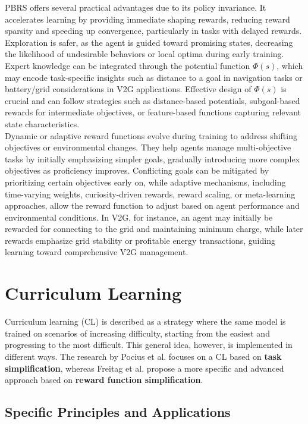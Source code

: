PBRS offers several practical advantages due to its policy invariance. It accelerates learning by providing immediate shaping rewards, reducing reward sparsity and speeding up convergence, particularly in tasks with delayed rewards. Exploration is safer, as the agent is guided toward promising states, decreasing the likelihood of undesirable behaviors or local optima during early training. Expert knowledge can be integrated through the potential function $\Phi(s)$, which may encode task-specific insights such as distance to a goal in navigation tasks or battery/grid considerations in V2G applications. Effective design of $\Phi(s)$ is crucial and can follow strategies such as distance-based potentials, subgoal-based rewards for intermediate objectives, or feature-based functions capturing relevant state characteristics.
\\
\noindent
Dynamic or adaptive reward functions evolve during training to address shifting objectives or environmental changes. They help agents manage multi-objective tasks by initially emphasizing simpler goals, gradually introducing more complex objectives as proficiency improves. Conflicting goals can be mitigated by prioritizing certain objectives early on, while adaptive mechanisms, including time-varying weights, curiosity-driven rewards, reward scaling, or meta-learning approaches, allow the reward function to adjust based on agent performance and environmental conditions. In V2G, for instance, an agent may initially be rewarded for connecting to the grid and maintaining minimum charge, while later rewards emphasize grid stability or profitable energy transactions, guiding learning toward comprehensive V2G management.




\section{Curriculum Learning}
\label{sec:curriculum_learning}
Curriculum learning (CL) is described as a strategy where the same model is trained on scenarios of increasing difficulty, starting from the easiest and progressing to the most difficult. This general idea, however, is implemented in different ways. The research by Pocius et al. \cite{Curriculum_learning_2} focuses on a CL based on \textbf{task simplification}, whereas Freitag et al. \cite{Curriculum_learning} propose a more specific and advanced approach based on \textbf{reward function simplification}.

\subsection{Specific Principles and Applications}

